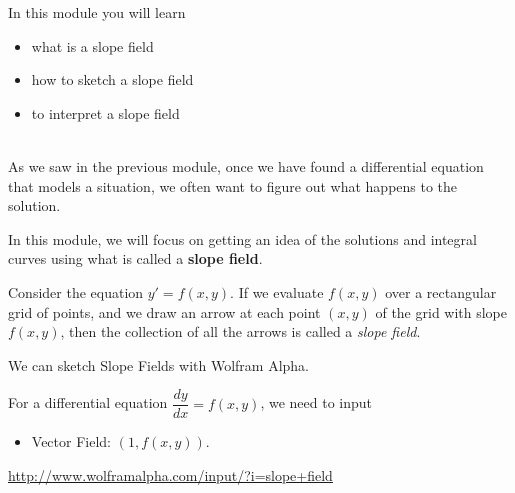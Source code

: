 In this module you will learn
\begin{itemize}
	\item what is a slope field
	\item how to sketch a slope field
	\item to interpret a slope field
\end{itemize}

\hfill \\

As we saw in the previous module, once we have found a differential equation that models a situation, we often want to figure out what happens to the solution.

In this module, we will focus on getting an idea of the solutions and integral curves using what is called a \textbf{slope field}.





\begin{definition} Consider the equation $y' = f(x,y)$.
If we evaluate $f(x,y)$ over a rectangular grid of points, and we draw an arrow at each point $(x,y)$ of the grid with slope $f(x,y)$, then the collection of all the arrows is called a \emph{slope field}.
\end{definition}

\begin{graybox}
	
We can sketch Slope Fields with Wolfram Alpha.

For a differential equation $\dfrac{dy}{dx} = f(x,y)$, we need to input
\begin{itemize}
	\item Vector Field: $(1, f(x,y))$.
\end{itemize}

\url{http://www.wolframalpha.com/input/?i=slope+field}
\hfill {}	
\end{graybox}





